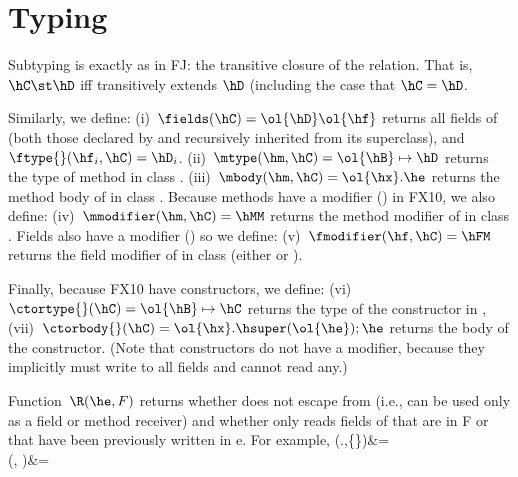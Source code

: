 \documentclass[9pt,a4paper]{article}
\begin{document}
\section{Typing}
{Subtyping} is exactly as in FJ:
    the transitive closure of the \hextends relation.
That is, $\hC \st \hD$ iff \hC transitively extends $\hD$ (including the case that $\hC=\hD$.

Similarly, we define:
(i)~$\fields(\hC)=\ol{\hD} \ol{\hf}$ returns all fields of \hC (both those declared by \hC and recursively inherited from its superclass),
    and~$\ftype{}(\hf_i,\hC) =\hD_i$.
(ii)~$\mtype(\hm,\hC) = \ol{\hB}\mapsto\hD$ returns the type of method \hm in class \hC.
(iii)~$\mbody(\hm,\hC) = \ol{\hx}.\he$ returns the method body of \hm in class \hC.
Because methods have a modifier (\hMM) in FX10, we also define:
(iv)~$\mmodifier(\hm,\hC) = \hMM$ returns the method modifier of \hm in class \hC.
Fields also have a modifier (\hFM) so we define:
(v)~$\fmodifier(\hf,\hC) = \hFM$ returns the field modifier of \hf in class \hC (either \hval or \hvar).

Finally, because FX10 have constructors, we define:
(vi)~$\ctortype{}(\hC) = \ol{\hB}\mapsto\hC$ returns the type of the constructor in \hC,
(vii)~$\ctorbody{}(\hC) = \ol{\hx}.\hsuper(\ol{\he});\he$ returns the body of the constructor.
(Note that constructors do not have a modifier, because they implicitly must write to all fields and cannot read any.)




Function~$\R(\he,F)$ returns whether \this does not escape from \he (i.e., \this can be used only as a field or method receiver)
    and whether \he only reads fields of \this that are in F or that have been previously written in e.
For example,
    \R(\this.\hf,\{\hf\})&=\htrue\\
    \R(, \emptyset)&=\htrue\\
\eeq
\end{document}

